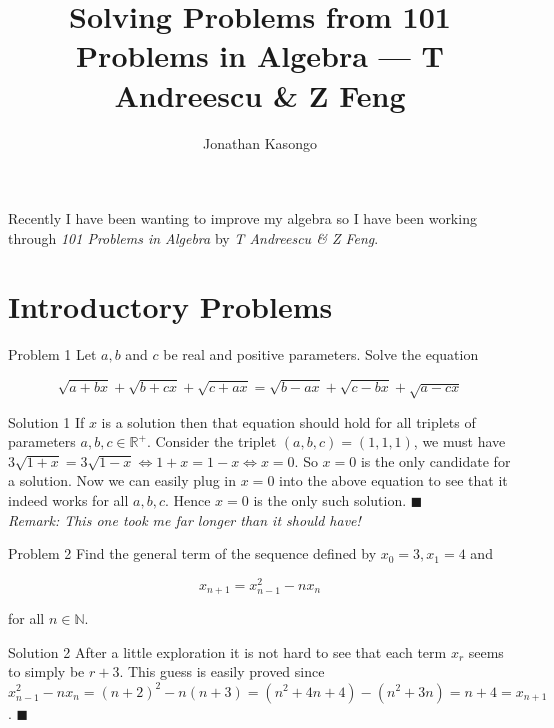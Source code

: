 \documentclass{article}
\author{Jonathan Kasongo}
\title{Solving Problems from 101 Problems in Algebra --- T Andreescu \& Z Feng}
\begin{document}
\maketitle

Recently I have been wanting to improve my algebra so I have been
working through \textit{101 Problems in Algebra} by
\textit{T Andreescu \& Z Feng}.

\section{Introductory Problems}

\begin{problem}{Problem 1}
Let $a,b$ and $c$ be real and positive parameters. Solve the equation

$$
\sqrt{a+bx} + \sqrt{b+cx} + \sqrt{c+ax} =
\sqrt{b-ax} + \sqrt{c-bx} + \sqrt{a-cx}
$$
\end{problem}

\begin{solution}{Solution 1}
If $x$ is a solution then that equation should hold for all triplets of
parameters $a,b,c \in \mathbb{R}^{+}$. Consider the triplet
$(a,b,c)=(1,1,1)$, we must have $3\sqrt{1+x} = 3\sqrt{1-x} \iff
1+x = 1-x \iff x=0$. So $x=0$ is the only candidate for a solution. Now
we can easily plug in $x=0$ into the above equation to see that it
indeed works for all $a,b,c$. Hence $x=0$ is the only such solution.
$\blacksquare$\\

\textit{Remark: This one took me far longer than it should have!}
\end{solution}

\vspace{0.2cm}

\begin{problem}{Problem 2}
Find the general term of the sequence defined by $x_0 = 3, x_1 = 4$ and

$$
x_{n+1} = x_{n-1}^2 - nx_n
$$

for all $n \in \mathbb{N}$.
\end{problem}

\begin{solution}{Solution 2}
After a little exploration it is not hard to see that each term $x_r$ seems
to simply be $r+3$. This guess is easily proved since
$x_{n-1}^2 - nx_n = (n+2)^2 - n(n+3) = (n^2 + 4n + 4) - (n^2 + 3n) = n+4 =
x_{n+1}$. $\blacksquare$
\end{solution}

\vspace{0.2cm}
\end{document}
